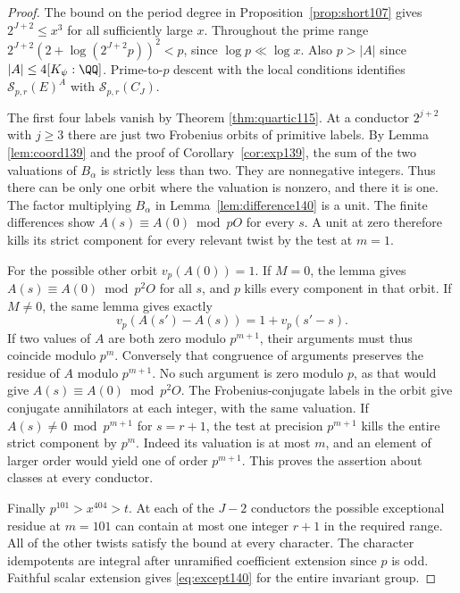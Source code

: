 \documentclass[a4paper,11pt]{article}
\theoremstyle{definition}
\theoremstyle{remark}
\numberwithin{equation}{section}
\begin{document}
\begin{proof}
The bound on the period degree in Proposition~\ref{prop:short107}
gives \(2^{J+2}\le x^3\) for all sufficiently large \(x\).
Throughout the prime range
\(2^{J+2}(2+\log(2^{J+2}p))^2<p\), since \(\log p\ll\log x\).
Also \(p>|A|\) since \(|A|\le4[K_\psi:\QQ]\). Prime-to-\(p\)
descent with the local conditions identifies
\(\mathcal S_{p,r}(E)^A\) with \(\mathcal S_{p,r}(C_J)\).

The first four labels vanish by Theorem \ref{thm:quartic115}.
At a conductor \(2^{j+2}\) with \(j\ge3\) there are just two
Frobenius orbits of primitive labels. By Lemma \ref{lem:coord139} and the proof of Corollary~\ref{cor:exp139}, the sum of the
two valuations of \(B_\alpha\) is strictly less than two.
They are nonnegative integers. Thus there can be only one
orbit where the valuation is nonzero, and there it is one.
The factor multiplying \(B_\alpha\) in Lemma~\ref{lem:difference140}
is a unit. The finite differences show \(A(s)\equiv A(0)\bmod pO\)
for every \(s\). A unit at zero therefore kills its strict
component for every relevant twist by the test at \(m=1\).

For the possible other orbit \(v_p(A(0))=1\). If \(M=0\),
the lemma gives \(A(s)\equiv A(0)\bmod p^2O\) for all \(s\),
and \(p\) kills every component in that orbit. If \(M\ne0\),
the same lemma gives exactly
\[
               v_p(A(s')-A(s))=1+v_p(s'-s).
\]
If two values of \(A\) are both zero modulo \(p^{m+1}\),
their arguments must thus coincide modulo \(p^m\).
Conversely that congruence of arguments preserves the residue
of \(A\) modulo \(p^{m+1}\). No such argument is zero modulo
\(p\), as that would give \(A(s)\equiv A(0)\bmod p^2O\).
The Frobenius-conjugate labels in the orbit give conjugate
annihilators at each integer, with the same valuation. If
\(A(s)\ne0\bmod p^{m+1}\) for \(s=r+1\), the test at precision
\(p^{m+1}\) kills the entire strict component by \(p^m\).
Indeed its valuation is at most \(m\), and an element of larger
order would yield one of order \(p^{m+1}\). This proves the
assertion about classes at every conductor.

Finally \(p^{101}>x^{404}>t\). At each of the \(J-2\)
conductors the possible exceptional residue at \(m=101\)
can contain at most one integer \(r+1\) in the required range.
All of the other twists satisfy the bound at every character.
The character idempotents are integral after unramified
coefficient extension since \(p\) is odd. Faithful scalar
extension gives \eqref{eq:except140} for the entire invariant
group.
\end{proof}
\end{document}
